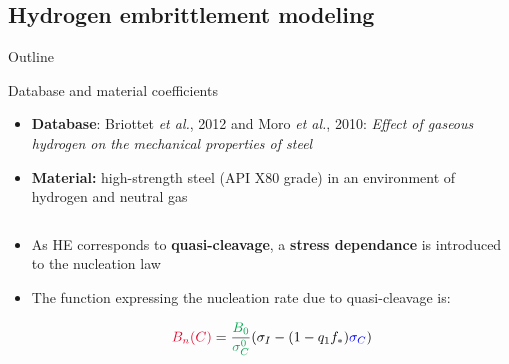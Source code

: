 \documentclass[9pt]{beamer}
\begin{document}

\subsection{Hydrogen embrittlement modeling}

\begin{frame}{Outline}
	\tableofcontents[ 
    currentsubsection, 
    hideothersubsections, 
    sectionstyle=show/shaded, 
    subsectionstyle=show/shaded, 
    ] 
\end{frame}


\begin{frame}{Database and material coefficients}

    \begin{itemize}
        \item \textbf{Database}: Briottet \textit{et al.}, 2012 and Moro \textit{et al.}, 2010: \textit{Effect of gaseous hydrogen on the mechanical properties of steel}
        
        \vspace{0.15cm}

        \item \textbf{Material:} high-strength steel (API X80 grade) in an environment of hydrogen and neutral gas
        
        \vspace{0.15cm}   

    \end{itemize}
    
\begin{columns}

	\begin{column}{0.6\textwidth}

	\begin{itemize}

		\item As HE corresponds to \textbf{quasi-cleavage}, a \textbf{stress dependance} is introduced to the nucleation law
                
		\vspace{0.15cm}
                
        \item The function expressing the nucleation rate due to quasi-cleavage is:
                
		\begin{equation*}
                    \textcolor{NewRed}{B_n(C)} = \frac{\textcolor{DarkGreen}{B_0}}{\textcolor{DarkGreen}{\sigma_C^0}} (\sigma_I - (1-q_1 f_{*})\textcolor{blue}{\sigma_C})
		\end{equation*}


\end{itemize}
\end{column}
\end{columns}
\end{frame}
\end{document}
